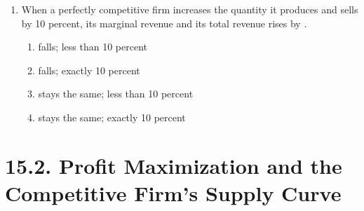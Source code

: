 \documentclass{article}
\begin{document}
\begin{enumerate}
\begin{enumerate}
		\end{enumerate}
		
	\item When a perfectly competitive firm increases the quantity it produces and sells by 10 percent, its marginal revenue \underline{\phantom{xxxxxxxxxx}} and its total revenue rises by \underline{\phantom{xxxxxxxxxx}}.
	
		\begin{enumerate}
		
		\item falls; less than 10 percent
		
		\item falls; exactly 10 percent
		
		\item stays the same; less than 10 percent
		
		\item stays the same; exactly 10 percent
		
		\end{enumerate}

\end{enumerate}

\section*{15.2. Profit Maximization and the Competitive Firm's Supply Curve}
\end{document}
